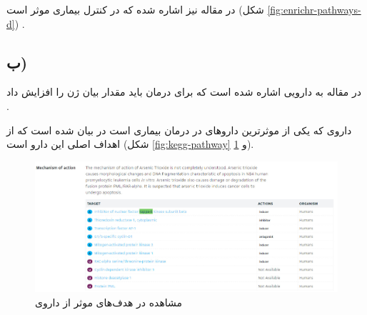 \documentclass{article}
\begin{document}
در مقاله \cite{cell-cycle} نیز اشاره شده که  در کنترل بیماری موثر است (شکل \ref{fig:enrichr-pathways-d})
.

\subsection*{ب)}
در مقاله \cite{irf8} به دارویی اشاره شده است که برای درمان  باید مقدار بیان ژن  را افزایش داد
.

داروی  که یکی از موثرترین داروهای در درمان بیماری  است در \cite{kappa} بیان شده است که  از اهداف اصلی این دارو است (شکل \ref{fig:kegg-pathway} و \ref{fig:kappa}).

\begin{figure}[h!]
	\centering
	\includegraphics[width=0.5\columnwidth]{figs/kappa.jpg}
	\caption{مشاهده  در هدف‌های موثر از داروی }
	\label{fig:kappa}
\end{figure}

\clearpage
\end{document}

